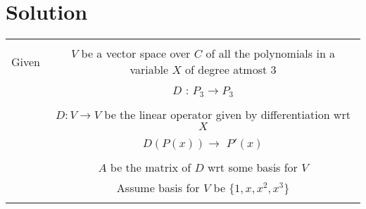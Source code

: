 \documentclass[journal,12pt,twocolumn]{IEEEtran}
\begin{document}
\section{\textbf{Solution}}
\begin{table}[h!]
\begin{center}
\begin{tabular}{|c|c|}
\hline
& \\
Given & $V$ be a vector space over $C$ of all the polynomials in a variable $X$ of degree atmost 3\\
& $D$ : $P_3 \xrightarrow{} P_3$ \\ 
& \\
& $D:V\xrightarrow{}V$ be the linear operator given by differentiation wrt $X$\\
& $D(P(x)) \xrightarrow{}$ $P'(x)$ \\
& \\
& $A$ be the matrix of $D$ wrt some basis for $V$ \\
& Assume basis for $V$ be $\{1,x,x^2,x^3\}$ \\
& \\
\hline
\end{tabular}
\end{center}
\end{table}
\end{document}
